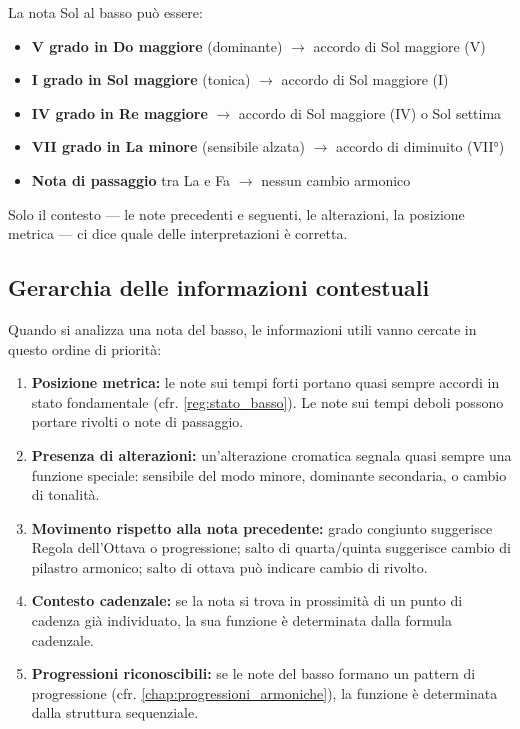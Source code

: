 \begin{esempio}
	\label{ex:ambiguita_sol}
	La nota Sol al basso può essere:
	\begin{itemize}
		\item \textbf{V grado in Do maggiore} (dominante) $\rightarrow$ accordo di Sol maggiore (V)
		\item \textbf{I grado in Sol maggiore} (tonica) $\rightarrow$ accordo di Sol maggiore (I)
		\item \textbf{IV grado in Re maggiore} $\rightarrow$ accordo di Sol maggiore (IV) o Sol settima
		\item \textbf{VII grado in La minore} (sensibile alzata) $\rightarrow$ accordo di \Soldiesis  diminuito (VII°)
		\item \textbf{Nota di passaggio} tra La e Fa $\rightarrow$ nessun cambio armonico
	\end{itemize}
	Solo il contesto --- le note precedenti e seguenti, le alterazioni, la posizione metrica --- ci dice quale delle interpretazioni è corretta.
\end{esempio}

\subsection{Gerarchia delle informazioni contestuali}

Quando si analizza una nota del basso, le informazioni utili vanno cercate in questo ordine di priorità:

\begin{regola}
	\label{reg:gerarchia_informazioni}
	\begin{enumerate}
		\item \textbf{Posizione metrica:} le note sui tempi forti portano quasi sempre accordi in stato fondamentale (cfr. \ref{reg:stato_basso}). Le note sui tempi deboli possono portare rivolti o note di passaggio.
		\item \textbf{Presenza di alterazioni:} un'alterazione cromatica segnala quasi sempre una funzione speciale: sensibile del modo minore, dominante secondaria, o cambio di tonalità.
		\item \textbf{Movimento rispetto alla nota precedente:} grado congiunto suggerisce Regola dell'Ottava o progressione; salto di quarta/quinta suggerisce cambio di pilastro armonico; salto di ottava può indicare cambio di rivolto.
		\item \textbf{Contesto cadenzale:} se la nota si trova in prossimità di un punto di cadenza già individuato, la sua funzione è determinata dalla formula cadenzale.
		\item \textbf{Progressioni riconoscibili:} se le note del basso formano un pattern di progressione (cfr. \ref{chap:progressioni_armoniche}), la funzione è determinata dalla struttura sequenziale.
	\end{enumerate}
\end{regola}

